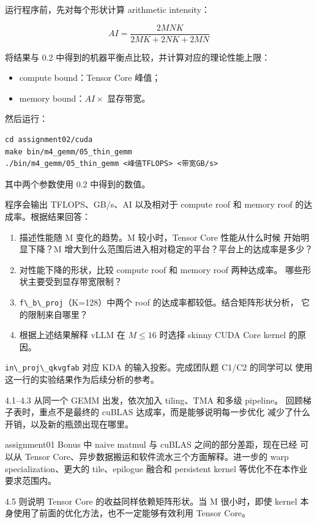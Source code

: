 \documentclass[11pt,a4paper,fontset=none]{ctexart}
\providecommand{\tightlist}{\setlength{\itemsep}{0pt}\setlength{\parskip}{0pt}}
\providecommand{\passthrough}[1]{#1}
\begin{document}
运行程序前，先对每个形状计算 arithmetic intensity：

\[
AI = \frac{2MNK}{2MK + 2NK + 2MN}
\]

将结果与 0.2 中得到的机器平衡点比较，并计算对应的理论性能上限：

\begin{itemize}
\tightlist
\item
  compute bound：Tensor Core 峰值；
\item
  memory bound：\(AI \times\) 显存带宽。
\end{itemize}

然后运行：

\begin{lstlisting}
cd assignment02/cuda
make bin/m4_gemm/05_thin_gemm
./bin/m4_gemm/05_thin_gemm <峰值TFLOPS> <带宽GB/s>
\end{lstlisting}

其中两个参数使用 0.2 中得到的数值。

程序会输出 TFLOPS、GB/s、AI 以及相对于 compute roof 和 memory roof
的达成率。根据结果回答：

\begin{enumerate}
\def\labelenumi{(\alph{enumi})}
\item
  描述性能随 M 变化的趋势。M 较小时，Tensor Core 性能从什么时候
  开始明显下降？M
  增大到什么范围后进入相对稳定的平台？平台上的达成率是多少？
\item
  对性能下降的形状，比较 compute roof 和 memory roof 两种达成率。
  哪些形状主要受到显存带宽限制？
\item
  \passthrough{\lstinline!f\_b\_proj!}（K=128）中两个 roof
  的达成率都较低。结合矩阵形状分析， 它的限制来自哪里？
\item
  根据上述结果解释 vLLM 在 \(M \le 16\) 时选择 skinny CUDA Core kernel
  的原因。
\end{enumerate}

\passthrough{\lstinline!in\_proj\_qkvgfab!} 对应 KDA
的输入投影。完成团队题 C1/C2 的同学可以
使用这一行的实验结果作为后续分析的参考。

\begin{lookback}

4.1--4.3 从同一个 GEMM 出发，依次加入 tiling、TMA 和多级 pipeline。
回顾梯子表时，重点不是最终的 cuBLAS 达成率，而是能够说明每一步优化
减少了什么开销，以及新的瓶颈出现在哪里。

assignment01 Bonus 中 naive matmul 与 cuBLAS 之间的部分差距，现在已经
可以从 Tensor Core、异步数据搬运和软件流水三个方面解释。进一步的 warp
specialization、更大的 tile、epilogue 融合和 persistent kernel
等优化不在本作业要求范围内。

4.5 则说明 Tensor Core 的收益同样依赖矩阵形状。当 M 很小时，即使 kernel
本身使用了前面的优化方法，也不一定能够有效利用 Tensor Core。

\end{lookback}
\end{document}
